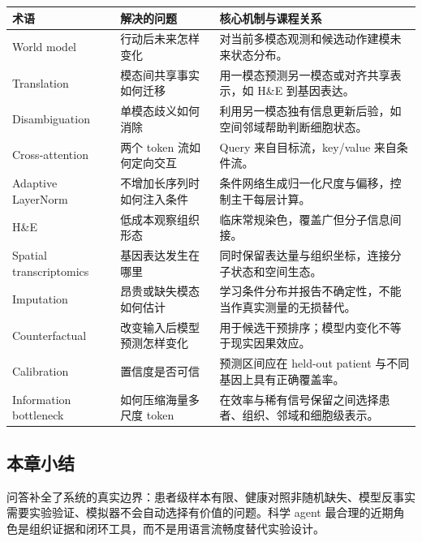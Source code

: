 \begin{center}
\small
\begin{tabularx}{\textwidth}{p{} X X}
\toprule
\textbf{术语} & \textbf{解决的问题} & \textbf{核心机制与课程关系} \\
\midrule
World model & 行动后未来怎样变化 & 对当前多模态观测和候选动作建模未来状态分布。 \\
Translation & 模态间共享事实如何迁移 & 用一模态预测另一模态或对齐共享表示，如 H\&E 到基因表达。 \\
Disambiguation & 单模态歧义如何消除 & 利用另一模态独有信息更新后验，如空间邻域帮助判断细胞状态。 \\
Cross-attention & 两个 token 流如何定向交互 & Query 来自目标流，key/value 来自条件流。 \\
Adaptive LayerNorm & 不增加长序列时如何注入条件 & 条件网络生成归一化尺度与偏移，控制主干每层计算。 \\
H\&E & 低成本观察组织形态 & 临床常规染色，覆盖广但分子信息间接。 \\
Spatial transcriptomics & 基因表达发生在哪里 & 同时保留表达量与组织坐标，连接分子状态和空间生态。 \\
Imputation & 昂贵或缺失模态如何估计 & 学习条件分布并报告不确定性，不能当作真实测量的无损替代。 \\
Counterfactual & 改变输入后模型预测怎样变化 & 用于候选干预排序；模型内变化不等于现实因果效应。 \\
Calibration & 置信度是否可信 & 预测区间应在 held-out patient 与不同基因上具有正确覆盖率。 \\
Information bottleneck & 如何压缩海量多尺度 token & 在效率与稀有信号保留之间选择患者、组织、邻域和细胞级表示。 \\
\bottomrule
\end{tabularx}
\end{center}

\subsection{本章小结}

问答补全了系统的真实边界：患者级样本有限、健康对照非随机缺失、模型反事实需要实验验证、模拟器不会自动选择有价值的问题。科学 agent 最合理的近期角色是组织证据和闭环工具，而不是用语言流畅度替代实验设计。

